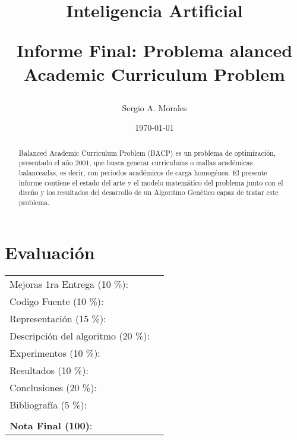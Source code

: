 \documentclass[letter, 10pt]{article}
\begin{document}
\title{Inteligencia Artificial \\ \begin{Large}Informe Final: Problema alanced Academic Curriculum Problem\end{Large}}
\author{Sergio A. Morales}
\date{\today}
\maketitle


\section*{Evaluación}

\begin{tabular}{ll}
Mejoras 1ra Entrega (10 \%): &  \underline{\hspace{2cm}}\\
Codigo Fuente (10 \%): &  \underline{\hspace{2cm}}\\
Representación (15 \%):  & \underline{\hspace{2cm}} \\
Descripción del algoritmo (20 \%):  & \underline{\hspace{2cm}} \\
Experimentos (10 \%):  & \underline{\hspace{2cm}} \\
Resultados (10 \%):  & \underline{\hspace{2cm}} \\
Conclusiones (20 \%): &  \underline{\hspace{2cm}}\\
Bibliografía (5 \%): & \underline{\hspace{2cm}}\\
 &  \\
\textbf{Nota Final (100)}:   & \underline{\hspace{2cm}}
\end{tabular}

\begin{abstract}
  Balanced Academic Curriculum Problem (BACP) es un problema de optimización,
  presentado el año 2001, que busca generar curriculums o mallas académicas
  balanceadas, es decir, con periodos académicos de carga homogénea. El presente
  informe contiene el estado del arte y el modelo matemático del problema junto
  con el diseño y los resultados del desarrollo de un Algoritmo Genético
  capaz de tratar este problema.
\end{abstract}
\end{document}
